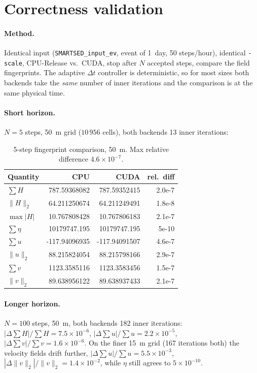 \documentclass[11pt,a4paper]{article}
\begin{document}
\section{Correctness validation}

\paragraph{Method.} Identical input (\texttt{SMARTSED\_input\_ev}, event of
\SI{1}{day}, 50 steps/hour), identical \texttt{-scale}, CPU-Release vs.\ CUDA,
stop after $N$ accepted steps, compare the field fingerprints. The adaptive
$\Delta t$ controller is deterministic, so for most sizes both backends take the
\emph{same} number of inner iterations and the comparison is at the same physical
time.

\paragraph{Short horizon.} $N=5$ steps, \SI{50}{m} grid ($10\,956$ cells), both
backends 13 inner iterations:

\begin{table}[h]
\centering
\small
\begin{tabular}{@{}l r r r@{}}
\toprule
Quantity & {CPU} & {CUDA} & {rel.\ diff} \\
\midrule
$\sum H$          & 787.59368082   & 787.59352415   & 2.0e-7 \\
$\lVert H\rVert_2$& 64.211250674   & 64.211249491   & 1.8e-8 \\
$\max|H|$         & 10.767808428   & 10.767806183   & 2.1e-7 \\
$\sum \eta$       & 10179747.195   & 10179747.195   & 5e-10 \\
$\sum u$          & -117.94096935  & -117.94091507  & 4.6e-7 \\
$\lVert u\rVert_2$& 88.215824054   & 88.215798166   & 2.9e-7 \\
$\sum v$          & 1123.3585116   & 1123.3583456   & 1.5e-7 \\
$\lVert v\rVert_2$& 89.638956122   & 89.638937433   & 2.1e-7 \\
\bottomrule
\end{tabular}
\caption{5-step fingerprint comparison, \SI{50}{m}. Max relative difference
$4.6\times10^{-7}$.}
\end{table}

\paragraph{Longer horizon.} $N=100$ steps, \SI{50}{m}, both backends 182 inner
iterations: $|\Delta\sum H|/\sum H = 7.5\times10^{-6}$,
$|\Delta\sum u|/\sum u = 2.2\times10^{-5}$,
$|\Delta\sum v|/\sum v = 1.6\times10^{-6}$. On the finer \SI{15}{m} grid
(167 iterations both) the velocity fields drift further,
$|\Delta\sum u|/\sum u = 5.5\times10^{-3}$,
$|\Delta\lVert v\rVert_2|/\lVert v\rVert_2 = 1.4\times10^{-2}$, while $\eta$
still agrees to $5\times10^{-10}$.
\end{document}
